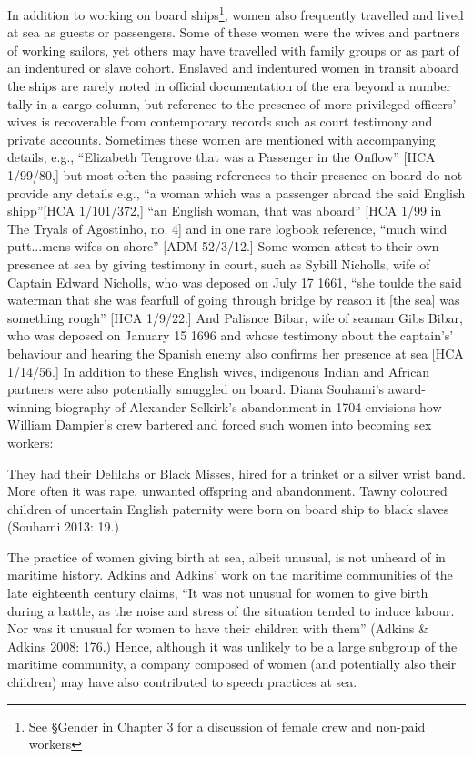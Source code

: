 \begin{styleStandard}
In addition to working on board ships\footnote{ See §Gender in Chapter 3 for a discussion of female crew and non-paid workers}, women also frequently travelled and lived at sea as guests or passengers. Some of these women were the wives and partners of working sailors, yet others may have travelled with family groups or as part of an indentured or slave cohort. Enslaved and indentured women in transit aboard the ships are rarely noted in official documentation of the era beyond a number tally in a cargo column, but reference to the presence of more privileged officers’ wives is recoverable from contemporary records such as court testimony and private accounts. Sometimes these women are mentioned with accompanying details, e.g., “Elizabeth Tengrove that was a Passenger in the Onflow” [HCA 1/99/80,] but most often the passing references to their presence on board do not provide any details e.g., “a woman which was a passenger abroad the said English shipp”[HCA 1/101/372,] “an English woman, that was aboard” [HCA 1/99 in The Tryals of Agostinho, no. 4] and in one rare logbook reference, “much wind putt...mens wifes on shore” [ADM 52/3/12.] Some women attest to their own presence at sea by giving testimony in court, such as Sybill Nicholls, wife of Captain Edward Nicholls, who was deposed on July 17 1661, “she toulde the said waterman that she was fearfull of going through bridge by reason it [the sea] was something rough” [HCA 1/9/22.] And Palisnce Bibar, wife of seaman Gibs Bibar, who was deposed on January 15 1696 and whose testimony about the captain's’ behaviour and hearing the Spanish enemy also confirms her presence at sea [HCA 1/14/56.] In addition to these English wives, indigenous Indian and African partners were also potentially smuggled on board. Diana Souhami’s award-winning biography of Alexander Selkirk’s abandonment in 1704 envisions how William Dampier’s crew bartered and forced such women into becoming sex workers:
\end{styleStandard}

\begin{styleStandard}
They had their Delilahs or Black Misses, hired for a trinket or a silver wrist band. More often it was rape, unwanted offspring and abandonment. Tawny coloured children of uncertain English paternity were born on board ship to black slaves (Souhami 2013: 19.)
\end{styleStandard}

\begin{styleStandard}
The practice of women giving birth at sea, albeit unusual, is not unheard of in maritime history. Adkins and Adkins’ work on the maritime communities of the late eighteenth century claims, “It was not unusual for women to give birth during a battle, as the noise and stress of the situation tended to induce labour. Nor was it unusual for women to have their children with them” (Adkins \& Adkins 2008: 176.) Hence, although it was unlikely to be a large subgroup of the maritime community, a company composed of women (and potentially also their children) may have also contributed to speech practices at sea. 
\end{styleStandard}

